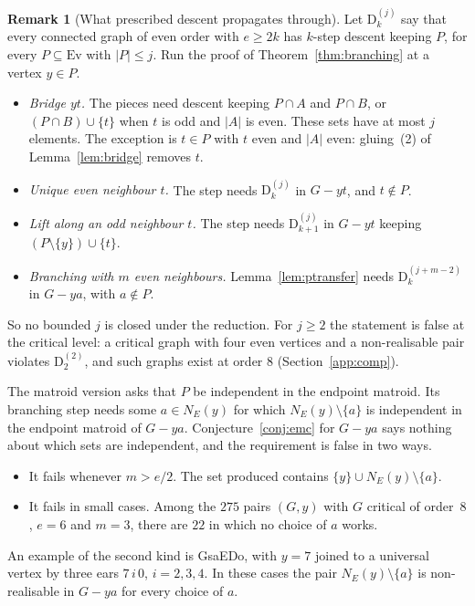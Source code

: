 \documentclass[11pt]{amsart}
\theoremstyle{definition}
\newtheorem{remark}[theorem]{Remark}
\newcommand{\Ev}{\mathrm{Ev}}
\begin{document}
\begin{remark}[What prescribed descent propagates through]\label{rem:propagate}
Let $\mathrm{D}^{(j)}_k$ say that every connected graph of even order with $e\ge2k$ has $k$-step
descent keeping $P$, for every $P\subseteq\Ev$ with $|P|\le j$. Run the proof of
Theorem~\ref{thm:branching} at a vertex $y\in P$.
\begin{itemize}
\item \emph{Bridge $yt$.} The pieces need descent keeping $P\cap A$ and $P\cap B$, or
$(P\cap B)\cup\{t\}$ when $t$ is odd and $|A|$ is even. These sets have at most $j$ elements.
The exception is $t\in P$ with $t$ even and $|A|$ even: gluing~(2) of Lemma~\ref{lem:bridge} removes $t$.
\item \emph{Unique even neighbour $t$.} The step needs $\mathrm{D}^{(j)}_k$ in $G-yt$, and $t\notin P$.
\item \emph{Lift along an odd neighbour $t$.} The step needs $\mathrm{D}^{(j)}_{k+1}$ in $G-yt$
keeping $(P\setminus\{y\})\cup\{t\}$.
\item \emph{Branching with $m$ even neighbours.} Lemma~\ref{lem:ptransfer} needs
$\mathrm{D}^{(j+m-2)}_k$ in $G-ya$, with $a\notin P$.
\end{itemize}
So no bounded $j$ is closed under the reduction. For $j\ge2$ the statement is false at the critical
level: a critical graph with four even vertices and a non-realisable pair violates
$\mathrm{D}^{(2)}_2$, and such graphs exist at order $8$ (Section~\ref{app:comp}).

The matroid version asks that $P$ be independent in the endpoint matroid. Its branching step needs
some $a\in N_E(y)$ for which $N_E(y)\setminus\{a\}$ is independent in the endpoint matroid of
$G-ya$. Conjecture~\ref{conj:emc} for $G-ya$ says nothing about which sets are independent, and the
requirement is false in two ways.
\begin{itemize}
\item It fails whenever $m>e/2$. The set produced contains $\{y\}\cup N_E(y)\setminus\{a\}$.
\item It fails in small cases. Among the $275$ pairs $(G,y)$ with $G$ critical of order~$8$,
$e=6$ and $m=3$, there are $22$ in which no choice of $a$ works.
\end{itemize}
An example of the second kind is GsaEDo, with $y=7$ joined to a universal vertex by three ears
$7\,i\,0$, $i=2,3,4$. In these cases the pair $N_E(y)\setminus\{a\}$ is non-realisable in $G-ya$
for every choice of $a$.
\end{remark}
\end{document}
